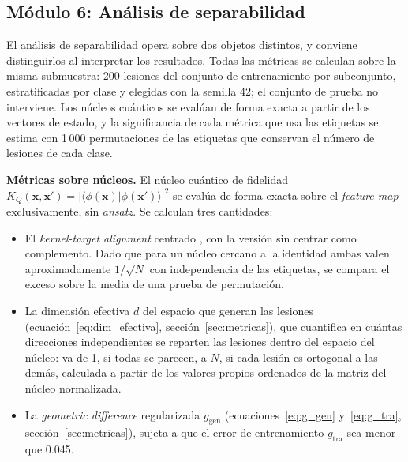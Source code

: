 
\subsection{Módulo 6: Análisis de separabilidad}

El análisis de separabilidad opera sobre dos objetos distintos, y conviene
distinguirlos al interpretar los resultados. Todas las métricas se calculan sobre
la misma submuestra: 200 lesiones del conjunto de entrenamiento por subconjunto,
estratificadas por clase y elegidas con la semilla 42; el conjunto de prueba no interviene.
Los núcleos cuánticos se evalúan de forma exacta a partir de los vectores de estado, y la
significancia de cada métrica que usa las etiquetas se estima con 1\,000 permutaciones de las etiquetas que
conservan el número de lesiones de cada clase.

\textbf{Métricas sobre núcleos.} El núcleo cuántico de fidelidad
$K_Q(\mathbf{x},\mathbf{x}') = |\langle\phi(\mathbf{x})|\phi(\mathbf{x}')\rangle|^2$ se
evalúa de forma exacta sobre el \textit{feature map} exclusivamente, sin \textit{ansatz}.
Se calculan tres cantidades:
\begin{itemize}
  \item El \textit{kernel-target alignment} centrado \cite{Cortes2012}, con la versión sin
        centrar \cite{cristianini2002kernel} como complemento. Dado que para un núcleo cercano a la
        identidad ambas valen aproximadamente $1/\sqrt{N}$ con independencia de las
        etiquetas, se compara el exceso sobre la media de una prueba de permutación.
  \item La dimensión efectiva $d$ del espacio que generan las lesiones \cite{huang2021power}
        (ecuación~\eqref{eq:dim_efectiva}, sección~\ref{sec:metricas}), que cuantifica en cuántas
        direcciones independientes se reparten las lesiones dentro del espacio del núcleo: va de
        1, si todas se parecen, a $N$, si cada lesión es ortogonal a las demás, calculada a partir
        de los valores propios ordenados de la matriz del núcleo normalizada.
  \item La \textit{geometric difference} regularizada $g_{\mathrm{gen}}$ \cite{huang2021power}
        (ecuaciones~\eqref{eq:g_gen} y~\eqref{eq:g_tra}, sección~\ref{sec:metricas}), sujeta a que
        el error de entrenamiento $g_{\mathrm{tra}}$ sea menor que 0.045.
\end{itemize}

